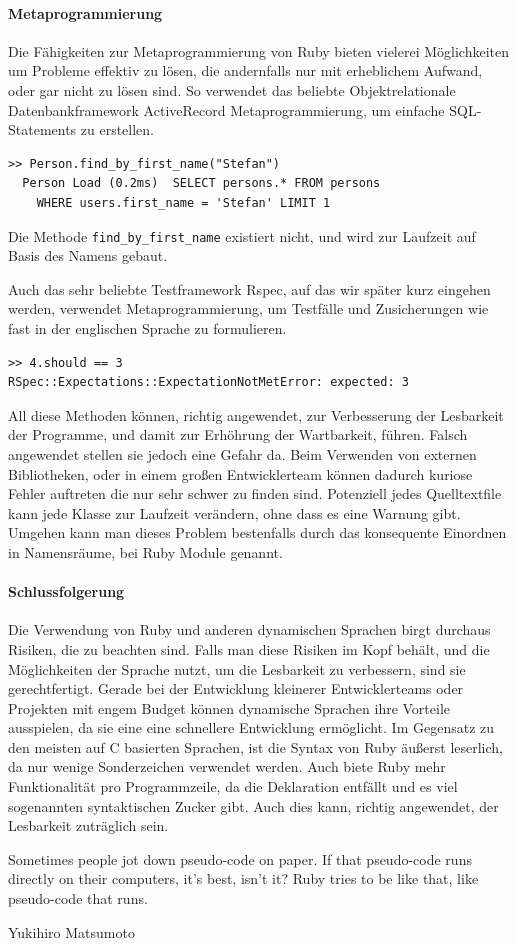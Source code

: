 \paragraph{Metaprogrammierung}
Die Fähigkeiten zur Metaprogrammierung von Ruby bieten vielerei Möglichkeiten um Probleme effektiv zu lösen, die andernfalls nur mit erheblichem Aufwand, oder gar nicht zu lösen sind. So verwendet das beliebte Objektrelationale Datenbankframework ActiveRecord Metaprogrammierung, um einfache SQL-Statements zu erstellen.
\begin{lstlisting}
>> Person.find_by_first_name("Stefan")
  Person Load (0.2ms)  SELECT persons.* FROM persons
    WHERE users.first_name = 'Stefan' LIMIT 1
\end{lstlisting}

Die Methode \texttt{find\_by\_first\_name} existiert nicht, und wird zur Laufzeit auf Basis des Namens gebaut.

Auch das sehr beliebte Testframework Rspec, auf das wir später kurz eingehen werden, verwendet Metaprogrammierung, um Testfälle und Zusicherungen wie fast in der englischen Sprache zu formulieren.

\begin{lstlisting}
>> 4.should == 3
RSpec::Expectations::ExpectationNotMetError: expected: 3
\end{lstlisting}

All diese Methoden können, richtig angewendet, zur Verbesserung der Lesbarkeit der Programme, und damit zur Erhöhrung der Wartbarkeit, führen.
Falsch angewendet stellen sie jedoch eine Gefahr da. Beim Verwenden von externen Bibliotheken, oder in einem großen Entwicklerteam können dadurch kuriose Fehler auftreten die nur sehr schwer zu finden sind. Potenziell jedes Quelltextfile kann jede Klasse zur Laufzeit verändern, ohne dass es eine Warnung gibt. Umgehen kann man dieses Problem bestenfalls durch das konsequente Einordnen in Namensräume, bei Ruby Module genannt.

\paragraph{Schlussfolgerung}

Die Verwendung von Ruby und anderen dynamischen Sprachen birgt durchaus Risiken, die zu beachten sind. Falls man diese Risiken im Kopf behält, und die Möglichkeiten der Sprache nutzt, um die Lesbarkeit zu verbessern, sind sie gerechtfertigt. Gerade bei der Entwicklung kleinerer Entwicklerteams oder Projekten mit engem Budget können dynamische Sprachen ihre Vorteile ausspielen, da sie eine eine schnellere Entwicklung ermöglicht. Im Gegensatz zu den meisten auf C basierten Sprachen, ist die Syntax von Ruby äußerst leserlich, da nur wenige Sonderzeichen verwendet werden. Auch biete Ruby mehr Funktionalität pro Programmzeile, da die Deklaration entfällt und es viel sogenannten syntaktischen Zucker gibt. Auch dies kann, richtig angewendet, der Lesbarkeit zuträglich sein.
\epigraph{Sometimes people jot down pseudo-code on paper. If that pseudo-code runs directly on their computers, it's best, isn't it? Ruby tries to be like that, like pseudo-code that runs. }{Yukihiro Matsumoto}

